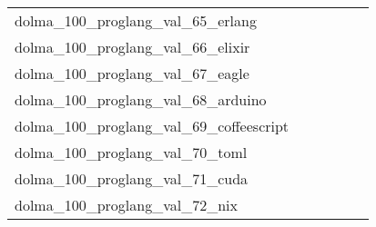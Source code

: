 {\begin{longtable}{m{6cm}m{1.7cm}m{1.7cm}m{1.7cm}m{1.7cm}m{1.7cm}}
	dolma\_100\_proglang\_val\_65\_erlang  & \colorbox[HTML]{77c578}{\makebox[\mywidth][c]{2.84}} & \colorbox[HTML]{dcf1a5}{\makebox[\mywidth][c]{2.98}} & \colorbox[HTML]{ffffe5}{\makebox[\mywidth][c]{3.87}} & \colorbox[HTML]{a2d889}{\makebox[\mywidth][c]{2.88}} & \colorbox[HTML]{82ca7d}{\makebox[\mywidth][c]{2.85}}\\
	dolma\_100\_proglang\_val\_66\_elixir  & \colorbox[HTML]{9fd688}{\makebox[\mywidth][c]{2.93}} & \colorbox[HTML]{d8efa2}{\makebox[\mywidth][c]{2.99}} & \colorbox[HTML]{ffffe5}{\makebox[\mywidth][c]{3.58}} & \colorbox[HTML]{87cc7f}{\makebox[\mywidth][c]{2.91}} & \colorbox[HTML]{77c578}{\makebox[\mywidth][c]{2.90}}\\
	dolma\_100\_proglang\_val\_67\_eagle  & \colorbox[HTML]{77c578}{\makebox[\mywidth][c]{5.35}} & \colorbox[HTML]{f9fcc5}{\makebox[\mywidth][c]{6.90}} & \colorbox[HTML]{ffffe5}{\makebox[\mywidth][c]{10.75}} & \colorbox[HTML]{acdc8d}{\makebox[\mywidth][c]{5.64}} & \colorbox[HTML]{bbe395}{\makebox[\mywidth][c]{5.76}}\\
	dolma\_100\_proglang\_val\_68\_arduino  & \colorbox[HTML]{e7f5ad}{\makebox[\mywidth][c]{3.37}} & \colorbox[HTML]{f5fbb8}{\makebox[\mywidth][c]{3.40}} & \colorbox[HTML]{ffffe5}{\makebox[\mywidth][c]{3.81}} & \colorbox[HTML]{7fc97b}{\makebox[\mywidth][c]{3.28}} & \colorbox[HTML]{77c578}{\makebox[\mywidth][c]{3.28}}\\
	dolma\_100\_proglang\_val\_69\_coffeescript  & \colorbox[HTML]{afdd8f}{\makebox[\mywidth][c]{2.80}} & \colorbox[HTML]{e5f4ab}{\makebox[\mywidth][c]{2.85}} & \colorbox[HTML]{ffffe5}{\makebox[\mywidth][c]{3.27}} & \colorbox[HTML]{b6e092}{\makebox[\mywidth][c]{2.80}} & \colorbox[HTML]{77c578}{\makebox[\mywidth][c]{2.77}}\\
	dolma\_100\_proglang\_val\_70\_toml  & \colorbox[HTML]{f7fcbb}{\makebox[\mywidth][c]{7.76}} & \colorbox[HTML]{c5e799}{\makebox[\mywidth][c]{7.62}} & \colorbox[HTML]{ffffe5}{\makebox[\mywidth][c]{8.44}} & \colorbox[HTML]{77c578}{\makebox[\mywidth][c]{7.53}} & \colorbox[HTML]{a7da8b}{\makebox[\mywidth][c]{7.58}}\\
	dolma\_100\_proglang\_val\_71\_cuda  & \colorbox[HTML]{77c578}{\makebox[\mywidth][c]{2.15}} & \colorbox[HTML]{e5f4ab}{\makebox[\mywidth][c]{2.21}} & \colorbox[HTML]{ffffe5}{\makebox[\mywidth][c]{2.56}} & \colorbox[HTML]{c6e89a}{\makebox[\mywidth][c]{2.19}} & \colorbox[HTML]{9bd587}{\makebox[\mywidth][c]{2.16}}\\
	dolma\_100\_proglang\_val\_72\_nix  & \colorbox[HTML]{77c578}{\makebox[\mywidth][c]{7.80}} & \colorbox[HTML]{96d385}{\makebox[\mywidth][c]{7.84}} & \colorbox[HTML]{ffffe5}{\makebox[\mywidth][c]{9.03}} & \colorbox[HTML]{b0de8f}{\makebox[\mywidth][c]{7.88}} & \colorbox[HTML]{90d082}{\makebox[\mywidth][c]{7.83}}\\

\end{longtable}}
